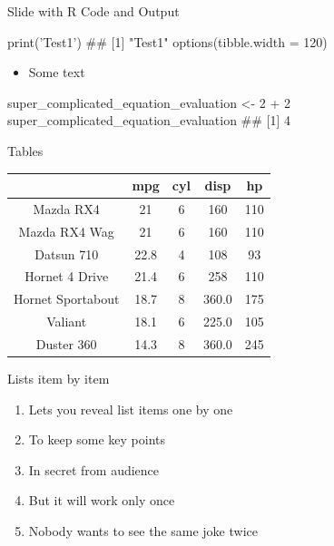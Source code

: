 \documentclass[ignorenonframetext,]{beamer}
\newenvironment{Shaded}{}{}
\newcommand{\CommentTok}[1]{\textcolor[rgb]{0.00,0.50,0.00}{#1}}
\newcommand{\DataTypeTok}[1]{#1}
\newcommand{\DecValTok}[1]{#1}
\newcommand{\KeywordTok}[1]{\textcolor[rgb]{0.00,0.00,1.00}{#1}}
\newcommand{\NormalTok}[1]{#1}
\newcommand{\OperatorTok}[1]{#1}
\newcommand{\StringTok}[1]{\textcolor[rgb]{0.00,0.50,0.50}{#1}}
\providecommand{\tightlist}{%
  \setlength{\itemsep}{0pt}\setlength{\parskip}{0pt}}
\begin{document}
\begin{frame}[fragile]{Slide with R Code and Output}
\protect\hypertarget{slide-with-r-code-and-output}{}

\scriptsize

\begin{Shaded}
\begin{Highlighting}[]
\KeywordTok{print}\NormalTok{(}\StringTok{'Test1'}\NormalTok{)}
\CommentTok{## [1] "Test1"}
\KeywordTok{options}\NormalTok{(}\DataTypeTok{tibble.width =} \DecValTok{120}\NormalTok{)}
\end{Highlighting}
\end{Shaded}

\begin{itemize}
\tightlist
\item
  Some text
\end{itemize}

\scriptsize

\begin{Shaded}
\begin{Highlighting}[]
\NormalTok{super_complicated_equation_evaluation <-}\StringTok{ }\DecValTok{2} \OperatorTok{+}\StringTok{ }\DecValTok{2}
\NormalTok{super_complicated_equation_evaluation}
\CommentTok{## [1] 4}
\end{Highlighting}
\end{Shaded}

\end{frame}

\begin{frame}{Tables}
\protect\hypertarget{tables}{}

\begin{longtable}[]{@{}ccccc@{}}
\toprule
& mpg & cyl & disp & hp\tabularnewline
\midrule
\endhead
Mazda RX4 & 21 & 6 & 160 & 110\tabularnewline
Mazda RX4 Wag & 21 & 6 & 160 & 110\tabularnewline
Datsun 710 & 22.8 & 4 & 108 & 93\tabularnewline
Hornet 4 Drive & 21.4 & 6 & 258 & 110\tabularnewline
Hornet Sportabout & 18.7 & 8 & 360.0 & 175\tabularnewline
Valiant & 18.1 & 6 & 225.0 & 105\tabularnewline
Duster 360 & 14.3 & 8 & 360.0 & 245\tabularnewline
\bottomrule
\end{longtable}

\end{frame}

\begin{frame}{Lists item by item}
\protect\hypertarget{lists-item-by-item}{}

\begin{enumerate}[<+->]
\tightlist
\item
  Lets you reveal list items one by one
\item
  To keep some key points
\item
  In secret from audience
\item
  But it will work only once
\item
  Nobody wants to see the same joke twice
\end{enumerate}

\end{frame}
\end{document}
